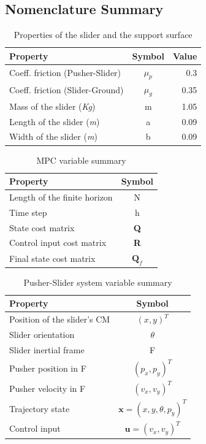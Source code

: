 \documentclass[12,twoside]{TFG-GM}
\theoremstyle{definition}
\theoremstyle{remark}
\begin{document}
\subsection{Nomenclature Summary}
\label{subsec:nomenclature}
\begin{table}[H]
\begin{center}
  \begin{tabular}{| l  c  r |}
    \hline
    Property & Symbol & Value \\ \hline
    Coeff. friction (Pusher-Slider)& $\mu_p$ & 0.3 \\
    Coeff. friction (Slider-Ground)& $\mu_g$ & 0.35 \\
    Mass of the slider (\textit{Kg}) & m & 1.05 \\
    Length of the slider (\textit{m}) & a & 0.09 \\
    Width of the slider (\textit{m}) & b & 0.09 \\
    \hline
  \end{tabular}
  \caption {Properties of the slider and the support surface}
\end{center}
\end{table}


\begin{table}[H]
\begin{center}
  \begin{tabular}{| l c |}
    \hline
    Property & Symbol \\ \hline
    Length of the finite horizon & N \\
    Time step & h \\    
    State cost matrix & \textbf{Q} \\
    Control input cost matrix & \textbf{R} \\    
    Final state cost matrix & $\textbf{Q}_f$ \\    
    \hline
  \end{tabular}
  \caption {MPC variable summary}
\end{center}
\end{table}

\begin{table}[H]
\begin{center}
  \begin{tabular}{| l c |}
    \hline
    Property & Symbol \\ \hline
    Position of the slider's CM & $(x, y)^T$ \\
    Slider orientation & $\theta$ \\
    Slider inertial frame & F \\
    Pusher position in F & $(p_x, p_y)^T$ \\
    Pusher velocity in F & $(v_x, v_y)^T$ \\
    Trajectory state & $\textbf{x} = (x, y, \theta, p_y)^T$ \\
    Control input & $\textbf{u} = (v_x, v_y)^T$ \\
    \hline
  \end{tabular}
  \caption {Pusher-Slider system variable summary}
\end{center}
\end{table}
\end{document}
